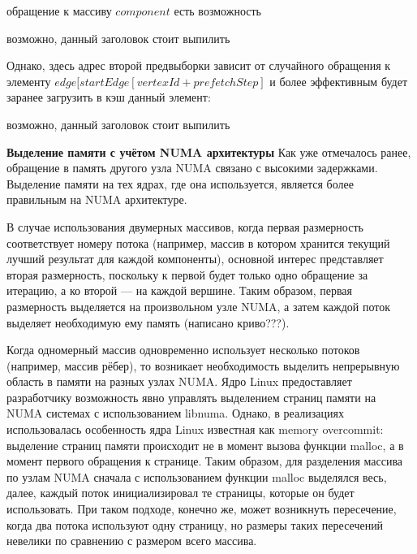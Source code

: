 \documentclass{article}
\begin{document}
обращение к массиву $component$ есть возможность 
\begin{algorithm}
    \SetAlgoLined
    \caption{возможно, данный заголовок стоит выпилить}
\end{algorithm}

Однако, здесь адрес второй предвыборки зависит от случайного обращения к элементу $edge[startEdge[vertexId + prefetchStep]$ и более эффективным будет заранее загрузить в кэш данный элемент:
\begin{algorithm}
    \SetAlgoLined
    \caption{возможно, данный заголовок стоит выпилить}
\end{algorithm}



\textbf{Выделение памяти с учётом NUMA архитектуры}
Как уже отмечалось ранее, обращение в память другого узла NUMA связано с высокими задержками. Выделение памяти на тех ядрах, где она используется, является более правильным на NUMA архитектуре.

В случае использования двумерных массивов, когда первая размерность соответствует номеру потока (например, массив в котором хранится текущий лучший результат для каждой компоненты), основной интерес представляет вторая размерность, поскольку к первой будет только одно обращение за итерацию, а ко второй --- на каждой вершине. Таким образом, первая размерность выделяется на произвольном узле NUMA, а затем каждой поток выделяет необходимую ему память (написано криво???).

Когда одномерный массив одновременно использует несколько потоков (например,  массив рёбер), то возникает необходимость выделить непрерывную область в памяти на разных узлах NUMA. Ядро Linux предоставляет разработчику возможность явно управлять выделением страниц памяти на NUMA системах с использованием libnuma. Однако, в реализациях использовалась особенность ядра Linux известная как memory overcommit: выделение страниц памяти происходит не в момент вызова функции malloc, а в момент первого обращения к странице. Таким образом, для разделения массива по узлам NUMA сначала с использованием функции malloc выделялся весь, далее, каждый поток инициализировал те страницы, которые он будет использовать. При таком подходе, конечно же, может возникнуть пересечение, когда два потока используют одну страницу, но размеры таких пересечений невелики по сравнению с размером всего массива.
\end{document}
